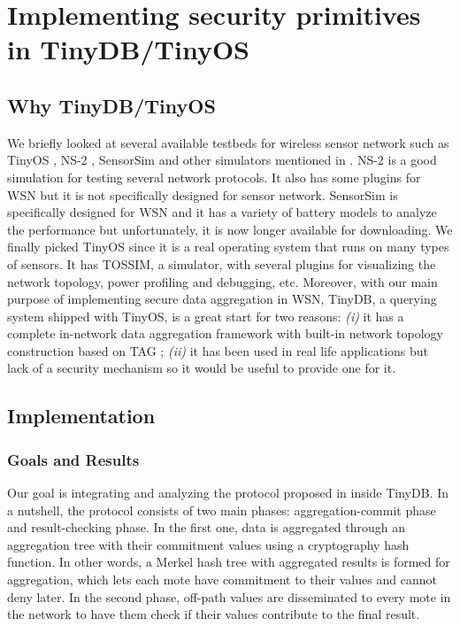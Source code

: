 \documentclass[a4paper]{article}
\begin{document}
\section{Implementing security primitives in TinyDB/TinyOS}
\label{sec:implement}

\subsection{Why TinyDB/TinyOS}

We briefly looked at several available testbeds for wireless sensor network
 such as TinyOS \cite{TinyOS}, NS-2 \cite{NS2}, SensorSim 
\cite{SensorSim} and other simulators mentioned in \cite{Yu}. NS-2 is a good
simulation for testing several network protocols. It also has some plugins for
WSN but it is not specifically designed for sensor network. SensorSim is
specifically designed for WSN and it has a variety of  battery models to analyze 
the performance but unfortunately, it is now longer available for downloading.
We finally picked TinyOS since it is a real operating system that runs on
many types of sensors. It has TOSSIM, a simulator, with several plugins
for visualizing the network topology, power profiling and debugging, etc.
Moreover, with our main purpose of implementing secure data aggregation
in WSN, TinyDB, a querying system shipped with TinyOS, is a great start
for two reasons: {\it (i)} it has a complete in-network data aggregation framework
with built-in network topology construction based on TAG \cite{TAG}; {\it (ii)} it
has been used in real life applications but lack of a security mechanism so 
it would be useful to provide one for it.

\subsection{Implementation}

\subsubsection{Goals and Results}

Our goal is integrating and analyzing the protocol proposed in \cite{Chan06}
inside TinyDB. In a nutshell, the protocol consists of two main phases:
aggregation-commit phase and result-checking phase. In the first one,
data is aggregated through an aggregation tree with their commitment
values using a cryptography hash function. In other words, a Merkel hash
tree with aggregated results is formed for aggregation, which lets each mote
have commitment to their values and cannot deny later. In the second phase,
off-path values are disseminated to every mote in the network to have them
check if their values contribute to the final result.
\end{document}

